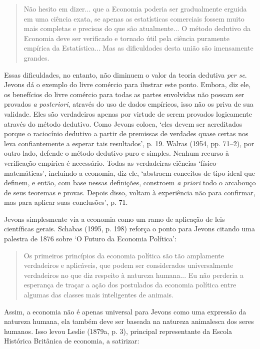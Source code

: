 \documentclass[12pt]{article}
\begin{document}
\begin{quote}
Não hesito em dizer... que a Economia poderia ser gradualmente erguida em uma ciência exata, se apenas as estatísticas comerciais fossem muito mais completas e precisas do que são atualmente... O método dedutivo da Economia deve ser verificado e tornado útil pela ciência puramente empírica da Estatística... Mas as dificuldades desta união são imensamente grandes.
\end{quote}

Essas dificuldades, no entanto, não diminuem o valor da teoria dedutiva \textit{per se}. Jevons dá o exemplo do livre comércio para ilustrar este ponto. Embora, diz ele, os benefícios do livre comércio para todas as partes envolvidas não possam ser provados \textit{a posteriori}, através do uso de dados empíricos, isso não os priva de sua validade. Eles são verdadeiros apenas por virtude de serem provados logicamente através do método dedutivo. Como Jevons coloca, ‘eles devem ser acreditados porque o raciocínio dedutivo a partir de premissas de verdades quase certas nos leva confiantemente a esperar tais resultados’, p. 19. Walras (1954, pp. 71–2), por outro lado, defende o método dedutivo puro e simples. Nenhum recurso à verificação empírica é necessário. Todas as verdadeiras ciências ‘físico-matemáticas’, incluindo a economia, diz ele, ‘abstraem conceitos de tipo ideal que definem, e então, com base nessas definições, constroem \textit{a priori} todo o arcabouço de seus teoremas e provas. Depois disso, voltam à experiência não para confirmar, mas para aplicar suas conclusões’, p. 71.

Jevons simplesmente via a economia como um ramo de aplicação de leis científicas gerais. Schabas (1995, p. 198) reforça o ponto para Jevons citando uma palestra de 1876 sobre ‘O Futuro da Economia Política’:

\begin{quote}
Os primeiros princípios da economia política são tão amplamente verdadeiros e aplicáveis, que podem ser considerados universalmente verdadeiros no que diz respeito à natureza humana... Eu não perderia a esperança de traçar a ação dos postulados da economia política entre algumas das classes mais inteligentes de animais.
\end{quote}

Assim, a economia não é apenas universal para Jevons como uma expressão da natureza humana, ela também deve ser baseada na natureza animalesca dos seres humanos. Isso levou Leslie (1879a, p. 3), principal representante da Escola Histórica Britânica de economia, a satirizar:
\end{document}
